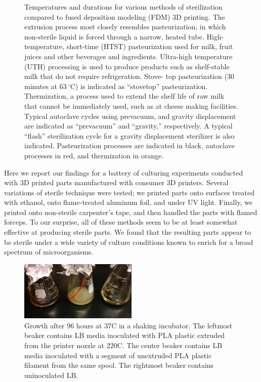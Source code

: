 \documentclass[fleqn,10pt]{wlpeerj}
\begin{document}
\begin{figure}
    \caption{Temperatures and durations for various methods of sterilization
compared to fused deposition modeling (FDM) 3D printing. The extrusion process
most closely resembles pasteurization, in which non-sterile liquid is forced
through a narrow, heated tube. High- temperature, short-time (HTST)
pasteurization used for milk, fruit juices and other beverages and
ingredients. Ultra-high temperature (UTH) processing is used to produce
products such as shelf-stable milk that do not require refrigeration. Stove-
top pasteurization (30 minutes at 63$\,^{\circ}\mathrm{C}$) is indicated as
``stovetop'' pasteurization. Thermization, a process used to extend the shelf
life of raw milk that cannot be immediately used, such as at cheese making
facilities. Typical autoclave cycles using prevacuum, and gravity displacement
are indicated as ``prevacuum'' and ``gravity,'' respectively. A typical
``flash'' sterilization cycle for a gravity displacement sterilizer is also
indicated. Pasteurization processes are indicated in black, autoclave
processes in red, and thermization in orange.} 

\label{fig:pasteurization}
\end{figure}

Here we report our findings for a battery of culturing experiments conducted
with 3D printed parts manufactured with consumer 3D printers. Several
variations of sterile technique were tested; we printed parts onto surfaces
treated with ethanol, onto flame-treated aluminum foil, and under UV light.
Finally, we printed onto non-sterile carpenter's tape, and then handled the
parts with flamed forceps. To our surprise, all of these methods seem to be at
least somewhat effective at producing sterile parts. We found that the
resulting parts appear to be sterile under a wide variety of culture
conditions known to enrich for a broad spectrum of microorganisms.

\begin{figure}
  \centering
    \includegraphics[width=0.5\textwidth]{preliminary_test}

    \caption{ Growth after 96 hours at 37C in a shaking incubator. The 
    leftmost beaker contains LB media inoculated with PLA plastic extruded
    from the printer nozzle at 220C. The center beaker contains LB media
    inoculated with a segment of unextruded PLA plastic filament from the same
    spool. The rightmost beaker contains uninoculated LB.}
    
    \label{fig:preliminary}
\end{figure}
\end{document}
